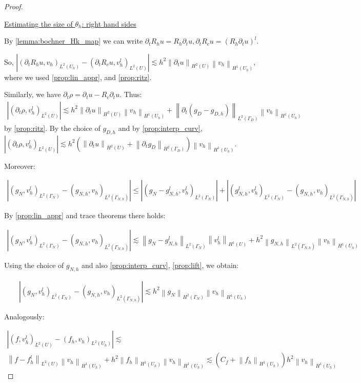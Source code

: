 \documentclass[english,a4paper,10pt,oneside]{scrbook}	%
\theoremstyle{break}
\newenvironment{mproof}[1][\proofname]{%
  \begin{proof}[#1]$ $\par\nobreak\ignorespaces
}{%
  \end{proof}
}
\renewcommand*{\proofname}{Proof}
\theoremstyle{remark}
\newcommand{\norm}[1]{\left\lVert#1\right\rVert}
\begin{document}
\begin{appendices}
\begin{mproof}
\underline{Estimating the size of $\theta_h$: right hand sides}

By \cref{lemma:bochner_Hk_map} we can write $\partial_t R_h u = R_h \partial_t u, \partial_t R_c u = (R_h \partial_t u)^l$.

So, $|(\partial_t R_h u , v_h)_{L^2(U_h)} - (\partial_t R_c u , v_h^l)_{L^2(U)}|\lesssim h^2 \norm{\partial_t u}_{H^2(U)}\norm{v_h}_{H^1(U_h)}$, where we used \cref{prop:lin_appr}, and \cref{prop:ritz}.

Similarly, we have $\partial_t \rho = \partial_t u - R_c\partial_t u$.
Thus:
\begin{align*}
| (\partial_t \rho, v_h^l)_{L^2(U)}|\lesssim h^2 \norm{\partial_t u}_{H^2(U)}\norm{v_h}_{H^1(U_h)} + \norm{\partial_t(g_D - g_{D,h}) }_{L^2(\Gamma_D)}\norm{v_h}_{H^1(U_h)}
\end{align*}
by \cref{prop:ritz}. By the choice of $g_{D,h}$ and by \cref{prop:interp_curv}, $| (\partial_t \rho, v_h^l)_{L^2(U)}|\lesssim h^2 (\norm{\partial_t u}_{H^2(U)} + \norm{\partial_t g_D}_{H^2(\Gamma_D)})\norm{v_h}_{H^1(U_h)}$.

Moreover:

\begin{align*}
	|(g_{N}, v_h^l)_{L^2(\Gamma_{N})} - (g_{N,h}, v_h)_{L^2(\Gamma_{N,h})} |\leq
	|(g_{N} - g_{N,h}^l, v_h^l)_{L^2(\Gamma_{N})}| + |(g_{N,h}^l, v_h^l)_{L^2(\Gamma_{N})} - (g_{N,h}, v_h)_{L^2(\Gamma_{N,h})} |
\end{align*}

By \cref{prop:lin_appr} and trace theorems there holds:


\begin{align*}
	|(g_{N}, v_h^l)_{L^2(\Gamma_{N})} - (g_{N,h}, v_h)_{L^2(\Gamma_{N,h})} |\lesssim
	\norm{g_{N} - g_{N,h}^l}_{L^2(\Gamma_{N})}\norm{v_h^l}_{H^1(U)} + h^2\norm{g_{N,h}}_{L^2(\Gamma_{N,h})} \norm{v_h}_{H^1(U_h )}
\end{align*}

Using the choice of $g_{N,h}$ and also \cref{prop:interp_curv}, \cref{prop:lift}, we obtain:

\begin{align*}
	|(g_{N}, v_h^l)_{L^2(\Gamma_{N})} - (g_{N,h}, v_h)_{L^2(\Gamma_{N,h})} |\lesssim 	h^2 \norm{g_N}_{H^2(\Gamma_N)}\norm{v_h}_{H^1(U_h)}
\end{align*}

Analogously:

\begin{align*}
	|(f, v_h^l)_{L^2(U)} - (f_h, v_h)_{L^2(U_h)}|\lesssim\\
	\norm{f-f_h^l}_{L^2(U)}\norm{v_h}_{H^1(U_h)} + h^2 \norm{f_h}_{H^1(U_h)}\norm{v_h}_{H^1(U_h)}\lesssim (C_f + \norm{f_h}_{H^1(U_h)}) h^2 \norm{v_h}_{H^1(U_h)}
\end{align*}


\end{mproof}
\end{appendices}
\end{document}
